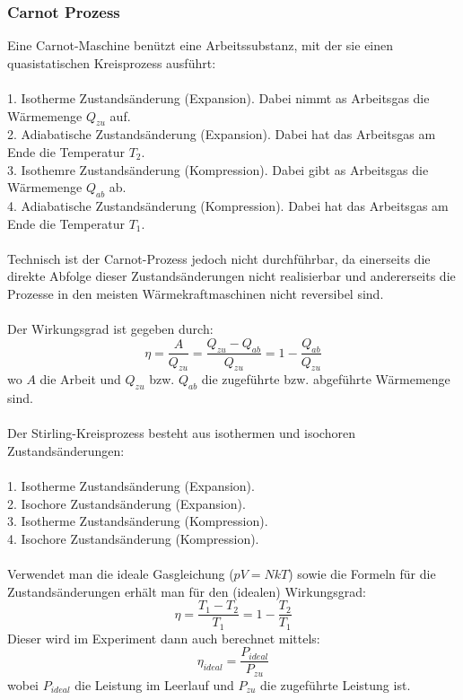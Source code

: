 \documentclass[12pt,a4paper,twopage]{article}
\begin{document}
\subsubsection{Carnot Prozess}
Eine Carnot-Maschine benützt eine Arbeitssubstanz, mit der sie einen quasistatischen Kreisprozess ausführt:\\
\\
1. Isotherme Zustandsänderung (Expansion). Dabei nimmt as Arbeitsgas die Wärmemenge $Q_{zu}$ auf.\\
2. Adiabatische Zustandsänderung (Expansion). Dabei hat das Arbeitsgas am Ende die Temperatur $T_2$.\\
3. Isothemre Zustandsänderung (Kompression). Dabei gibt as Arbeitsgas die Wärmemenge $Q_{ab}$ ab.\\
4. Adiabatische Zustandsänderung (Kompression). Dabei hat das Arbeitsgas am Ende die Temperatur $T_1$.\\
\\
Technisch ist der Carnot-Prozess jedoch nicht durchführbar, da einerseits die direkte Abfolge dieser Zustandsänderungen nicht realisierbar und andererseits die Prozesse in den meisten Wärmekraftmaschinen nicht reversibel sind.\\
\\
Der Wirkungsgrad ist gegeben durch:
$$\eta=\frac{A}{Q_{zu}}=\frac{Q_{zu}-Q_{ab}}{Q_{zu}}=1-\frac{Q_{ab}}{Q_{zu}}$$
wo $A$ die Arbeit und $Q_{zu}$ bzw. $Q_{ab}$ die zugeführte bzw. abgeführte Wärmemenge sind.\\
\\
Der Stirling-Kreisprozess besteht aus isothermen und isochoren Zustandsänderungen:\\
\\
1. Isotherme Zustandsänderung (Expansion).\\
2. Isochore Zustandsänderung (Expansion).\\
3. Isotherme Zustandsänderung (Kompression).\\
4. Isochore Zustandsänderung (Kompression).\\
\\
Verwendet man die ideale Gasgleichung ($pV=NkT$) sowie die Formeln für die Zustandsänderungen erhält man für den (idealen) Wirkungsgrad:
$$\eta=\frac{T_1-T_2}{T_1}=1-\frac{T_2}{T_1}$$
Dieser wird im Experiment dann auch berechnet mittels:
$$\eta_{ideal}=\frac{P_{ideal}}{P_{zu}}$$
wobei $P_{ideal}$ die Leistung im Leerlauf und $P_{zu}$ die zugeführte Leistung ist.\\
\\
\end{document}
